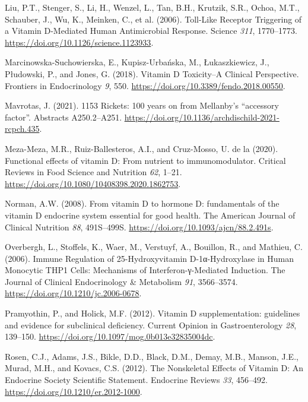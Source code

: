 \documentclass[
  a4paper,
  DIV=11,
  numbers=noendperiod,
  listof=totoc]{scrreprt}
\newlength{\cslhangindent}
\newlength{\cslentryspacingunit} %
\newenvironment{CSLReferences}[2] %
 {%
  \setlength{\parindent}{0pt}
  \ifodd #1
  \let\oldpar\par
  \def\par{\hangindent=\cslhangindent\oldpar}
  \fi
  \setlength{\parskip}{#2\cslentryspacingunit}
 }%
 {}
\begin{document}
\begin{CSLReferences}{0}{0}
\leavevmode{}%
Liu, P.T., Stenger, S., Li, H., Wenzel, L., Tan, B.H., Krutzik, S.R.,
Ochoa, M.T., Schauber, J., Wu, K., Meinken, C., et al. (2006).
{Toll-Like Receptor Triggering of a Vitamin D-Mediated Human
Antimicrobial Response}. Science \emph{311}, 1770--1773.
\url{https://doi.org/10.1126/science.1123933}.

\leavevmode{}%
Marcinowska-Suchowierska, E., Kupisz-Urbańska, M., Łukaszkiewicz, J.,
Płudowski, P., and Jones, G. (2018). {Vitamin D Toxicity--A Clinical
Perspective}. Frontiers in Endocrinology \emph{9}, 550.
\url{https://doi.org/10.3389/fendo.2018.00550}.

\leavevmode{}%
Mavrotas, J. (2021). {1153 Rickets: 100 years on from Mellanby's
{``accessory factor''}}. Abstracts A250.2--A251.
\url{https://doi.org/10.1136/archdischild-2021-rcpch.435}.

\leavevmode{}%
Meza-Meza, M.R., Ruiz-Ballesteros, A.I., and Cruz-Mosso, U. de la
(2020). {Functional effects of vitamin D: From nutrient to
immunomodulator}. Critical Reviews in Food Science and Nutrition
\emph{62}, 1--21. \url{https://doi.org/10.1080/10408398.2020.1862753}.

\leavevmode{}%
Norman, A.W. (2008). {From vitamin D to hormone D: fundamentals of the
vitamin D endocrine system essential for good health}. The American
Journal of Clinical Nutrition \emph{88}, 491S--499S.
\url{https://doi.org/10.1093/ajcn/88.2.491s}.

\leavevmode{}%
Overbergh, L., Stoffels, K., Waer, M., Verstuyf, A., Bouillon, R., and
Mathieu, C. (2006). {Immune Regulation of 25-Hydroxyvitamin
D-1α-Hydroxylase in Human Monocytic THP1 Cells: Mechanisms of
Interferon-γ-Mediated Induction}. The Journal of Clinical Endocrinology
\& Metabolism \emph{91}, 3566--3574.
\url{https://doi.org/10.1210/jc.2006-0678}.

\leavevmode{}%
Pramyothin, P., and Holick, M.F. (2012). {Vitamin D supplementation:
guidelines and evidence for subclinical deficiency}. Current Opinion in
Gastroenterology \emph{28}, 139--150.
\url{https://doi.org/10.1097/mog.0b013e32835004dc}.

\leavevmode{}%
Rosen, C.J., Adams, J.S., Bikle, D.D., Black, D.M., Demay, M.B., Manson,
J.E., Murad, M.H., and Kovacs, C.S. (2012). {The Nonskeletal Effects of
Vitamin D: An Endocrine Society Scientific Statement}. Endocrine Reviews
\emph{33}, 456--492. \url{https://doi.org/10.1210/er.2012-1000}.


\end{CSLReferences}
\end{document}
